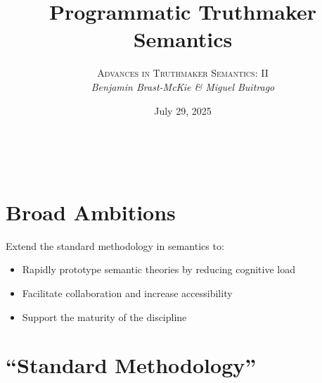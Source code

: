 \documentclass[a4paper, 11pt]{article} %
\title{\textbf{Programmatic Truthmaker Semantics}} %
\author{\textsc{Advances in Truthmaker Semantics: II}\\ \em Benjamin Brast-McKie \& Miguel Buitrago} %
\date{July 29, 2025} %
\makeatletter
\newcommand{\nicebox}[1]{%
  \par\noindent
  \begin{tcolorbox}
    #1
  \end{tcolorbox}
}
\theoremstyle{Pthm}
\renewcommand{\maketitle}{ %
\begin{flushright} %
{\LARGE\@title} %

\vspace{10pt} %

{\@author} %
\\\@date %

\vspace{30pt} %
\end{flushright}
}
\makeatother
\begin{document}
\maketitle %

\thispagestyle{empty}

\vspace{-20pt}


\section*{Broad Ambitions}

\nicebox{
	Extend the standard methodology in semantics to:
	\begin{itemize}
		\item Rapidly prototype semantic theories by reducing cognitive load
		\item Facilitate collaboration and increase accessibility
		\item Support the maturity of the discipline
	\end{itemize}
}




\section*{``Standard Methodology''}
\end{document}
